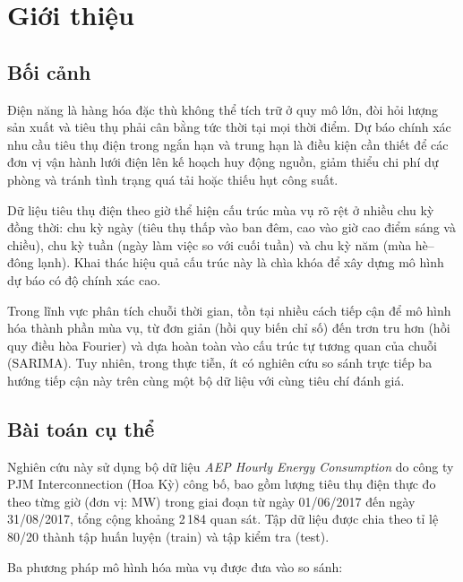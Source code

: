 \documentclass[12pt, a4paper]{article}
\theoremstyle{definition}
\begin{document}
\newpage
\tableofcontents
\newpage

\section{Giới thiệu}

\subsection{Bối cảnh}

Điện năng là hàng hóa đặc thù không thể tích trữ ở quy mô lớn, đòi hỏi lượng sản xuất và tiêu thụ phải cân bằng tức thời tại mọi thời điểm.
Dự báo chính xác nhu cầu tiêu thụ điện trong ngắn hạn và trung hạn là điều kiện cần thiết để các đơn vị vận hành lưới điện lên kế hoạch huy động nguồn, giảm thiểu chi phí dự phòng và tránh tình trạng quá tải hoặc thiếu hụt công suất.

Dữ liệu tiêu thụ điện theo giờ thể hiện cấu trúc mùa vụ rõ rệt ở nhiều chu kỳ đồng thời: chu kỳ ngày (tiêu thụ thấp vào ban đêm, cao vào giờ cao điểm sáng và chiều), chu kỳ tuần (ngày làm việc so với cuối tuần) và chu kỳ năm (mùa hè--đông lạnh). Khai thác hiệu quả cấu trúc này là chìa khóa để xây dựng mô hình dự báo có độ chính xác cao.

Trong lĩnh vực phân tích chuỗi thời gian, tồn tại nhiều cách tiếp cận để mô hình hóa thành phần mùa vụ, từ đơn giản (hồi quy biến chỉ số) đến trơn tru hơn (hồi quy điều hòa Fourier) và dựa hoàn toàn vào cấu trúc tự tương quan của chuỗi (SARIMA).
Tuy nhiên, trong thực tiễn, ít có nghiên cứu so sánh trực tiếp ba hướng tiếp cận này trên cùng một bộ dữ liệu với cùng tiêu chí đánh giá.

\subsection{Bài toán cụ thể}

Nghiên cứu này sử dụng bộ dữ liệu \textit{AEP Hourly Energy Consumption} do công ty PJM Interconnection (Hoa Kỳ) công bố, bao gồm lượng tiêu thụ điện thực đo theo từng giờ (đơn vị: MW) trong giai đoạn từ ngày 01/06/2017 đến ngày 31/08/2017, tổng cộng khoảng 2\,184 quan sát.
Tập dữ liệu được chia theo tỉ lệ 80/20 thành tập huấn luyện (train) và tập kiểm tra (test).

Ba phương pháp mô hình hóa mùa vụ được đưa vào so sánh:
\end{document}
